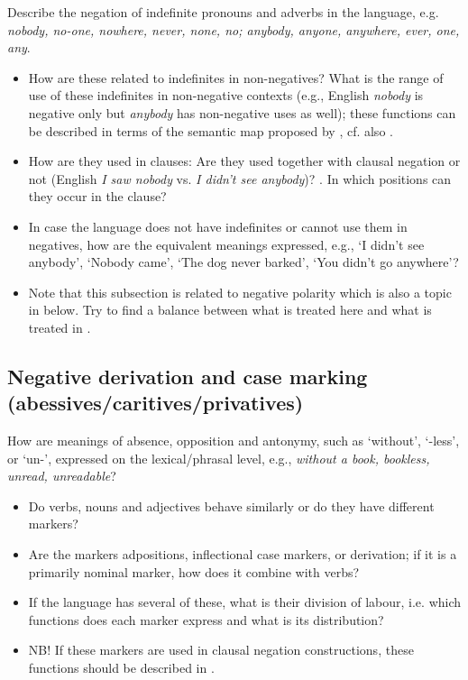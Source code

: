 \documentclass[output=paper,colorlinks,citecolor=brown]{langscibook}
\begin{document}
Describe the negation of indefinite pronouns and adverbs in the language, e.g. \textit{nobody, no-one, nowhere, never, none, no; anybody, anyone, anywhere, ever, one, any}. 

\begin{itemize}
    \item How are these related to indefinites in non-negatives? What is the range of use of these indefinites in non-negative contexts (e.g., English \textit{nobody} is negative only but \textit{anybody} has non-negative uses as well); these functions can be described in terms of the semantic map proposed by \citet{Haspelmath1997}, cf. also \citet{Alsenoy2014}.
    \item How are they used in clauses: Are they used together with clausal negation or not (English \textit{I saw nobody} vs. \textit{I didn’t see anybody})? \citep[cf.][]{Haspelmath2005}. In which positions can they occur in the clause?
    \item In case the language does not have indefinites or cannot use them in negatives, how are the equivalent meanings expressed, e.g., ‘I didn’t see anybody’, ‘Nobody came’, ‘The dog never barked’, ‘You didn’t go anywhere’? 
    \item Note that this subsection is related to negative polarity which is also a topic in  below. Try to find a balance between what is treated here and what is treated in .
\end{itemize}

\subsection{Negative derivation and case marking (abessives/caritives/privatives)}\label{sec:quest:3.3}

How are meanings of absence, opposition and antonymy, such as ‘without’, ‘\nobreakdash-less’, or ‘un-', expressed on the lexical/phrasal level, e.g., \textit{without a book, bookless, unread, unreadable}?

\begin{itemize}
    \item Do verbs, nouns and adjectives behave similarly or do they have different markers?
    \item Are the markers adpositions, inflectional case markers, or derivation; if it is a primarily nominal marker, how does it combine with verbs?
    \item If the language has several of these, what is their division of labour, i.e. which functions does each marker express and what is its distribution?
    \item NB! If these markers are used in clausal negation constructions, these functions should be described in .
\end{itemize}
\end{document}
